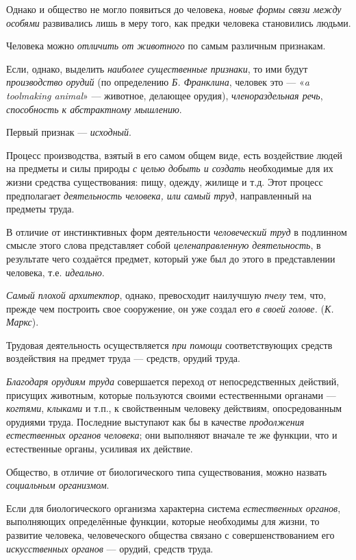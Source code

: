 \documentclass[a4paper,14pt,russian]{extreport}
\begin{document}
Однако и общество не могло появиться до человека, \emph{новые формы связи между особями} развивались лишь в меру того, как предки человека становились людьми.

Человека можно \emph{отличить от животного} по самым различным признакам.

Если, однако, выделить \emph{наиболее существенные признаки}, то ими будут \emph{производство орудий} (по определению \emph{Б. Франклина}, человек это --- «\emph{a toolmaking animal}» --- животное, делающее орудия), \emph{членораздельная речь}, \emph{способность к абстрактному мышлению}.

Первый признак --- \emph{исходный}.

Процесс производства, взятый в его самом общем виде, есть воздействие людей на предметы и силы природы \emph{с целью добыть и создать} необходимые для их жизни средства существования: пищу, одежду, жилище и т.д. Этот процесс предполагает \emph{деятельность человека, или самый труд}, направленный на предметы труда.

В отличие от инстинктивных форм деятельности \emph{человеческий труд} в подлинном смысле этого слова представляет собой \emph{целенаправленную деятельность}, в результате чего создаётся предмет, который уже был до этого в представлении человека, т.е. \emph{идеально}.

\emph{Самый плохой архитектор}, однако, превосходит наилучшую \emph{пчелу} тем, что, прежде чем построить свое сооружение, он уже создал его \emph{в своей голове.} (\emph{К. Маркс}).

Трудовая деятельность осуществляется \emph{при помощи} соответствующих средств воздействия на предмет труда --- средств, орудий труда.

\emph{Благодаря орудиям труда} совершается переход от непосредственных действий, присущих животным, которые пользуются своими естественными органами --- \emph{когтями}, \emph{клыками} и т.п., к свойственным человеку действиям, опосредованным орудиями труда. Последние выступают как бы в качестве \emph{продолжения естественных органов человека}; они выполняют вначале те же функции, что и естественные органы, усиливая их действие.

Общество, в отличие от биологического типа существования, можно назвать \emph{социальным организмом}.

Если для биологического организма характерна система \emph{естественных органов}, выполняющих определённые функции, которые необходимы для жизни, то развитие человека, человеческого общества связано с совершенствованием его \emph{искусственных органов} --- орудий, средств труда.
\end{document}
